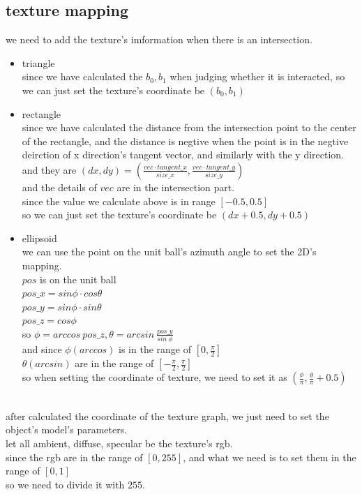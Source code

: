 \documentclass[acmtog]{acmart}
\begin{document}
\subsection{texture mapping}
we need to add the texture's imformation when there is an intersection.\\
\begin{itemize}
	\item triangle
	\\
	since we have calculated the $b_0,b_1$ when judging whether it is interacted,
	so we can just set the texture's coordinate be $(b_0,b_1)$

	\item rectangle
	\\
	since we have calculated the distance from the intersection point to the center of the rectangle,
	and the distance is negtive when the point is in the negtive deirction of x direction's tangent vector,
	and similarly with the y direction.\\
	and they are $(dx,dy) = (\frac{vec\cdot tangent\_x}{size\_x},\frac{vec\cdot tangent\_y}{size\_y})$\\
	and the details of $vec$ are in the intersection part.\\
	since the value we calculate above is in range $[-0.5,0.5]$\\	
	so we can just set the texture's coordinate be $(dx + 0.5, dy + 0.5)$

	\item ellipsoid
	\\
	we can use the point on the unit ball's azimuth angle to set the 2D's mapping.\\
	$pos$ is on the unit ball\\
  	$pos\_x = sin\phi\cdot cos\theta$\\
  	$pos\_y = sin\phi\cdot sin\theta$\\
  	$pos\_z = cos\phi$\\
  	so $\phi = arccos\ pos\_z, \theta = arcsin \ \frac{pos\_y}{sin\ \phi}$\\
	and since $\phi(arccos)$  is in the range of $[0,\frac{\pi}{2}]$\\
	$\theta(arcsin)$ are in the range of $[-\frac{\pi}{2},\frac{\pi}{2}]$\\
  
	so when setting the coordinate of texture, we need to set it as $(\frac{\phi}{\pi},\frac{\theta}{\pi}+0.5)$

\end{itemize}
\\
after calculated the coordinate of the texture graph, 
we just need to set the object's model's parameters.\\
let all ambient, diffuse, specular be the texture's rgb.\\
since the rgb are in the range of $[0,255]$, and what we need is to set them in the range of $[0,1]$\\
so we need to divide it with $255$.
\end{document}
